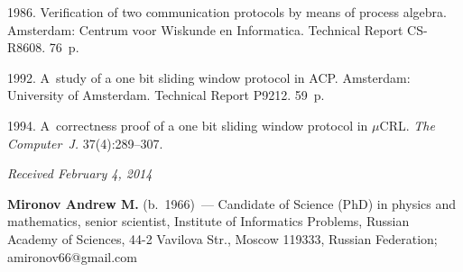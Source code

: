 \begin{multicols}{2}
{{\begin{thebibliography}{99}
1986. Verification of two communication protocols by means of process algebra.
 Amsterdam: Centrum voor Wiskunde en Informatica.  Technical Report CS-R8608.
 76~p.

1992. A~study of a one bit sliding window protocol in ACP.
Amsterdam: University of Amsterdam.  Technical Report P9212. 59~p.

1994. A~correctness proof of a one bit sliding window
protocol in $\mu$CRL. \textit{The Computer~J.}
37(4):289--307.

\end{thebibliography}
} }


\end{multicols}

\vspace*{-6pt}

\hfill{\small\textit{Received February 4, 2014}}

\vspace*{-18pt}


\Contrl

\noindent
\textbf{Mironov Andrew M.} (b.\ 1966)~---
 Candidate of Science (PhD) in physics and mathematics, senior scientist,
 Institute of Informatics Problems, Russian Academy of Sciences,
 44-2 Vavilova Str., Moscow 119333, Russian Federation; amironov66@gmail.com

  \label{end\stat}

\renewcommand{\bibname}{\protect\rm Литература}

